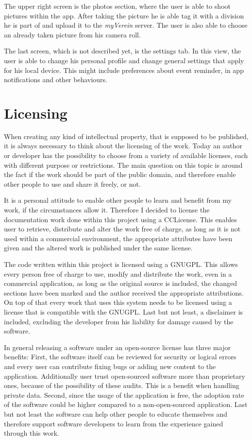 The upper right screen is the photos section, where the user is able to shoot pictures within the app. After taking the picture he is able tag it with a division he is part of and upload it to the \emph{myVerein} server. The user is also able to choose an already taken picture from his camera roll.

The last screen, which is not described yet, is the settings tab. In this view, the user is able to change his personal profile and change general settings that apply for his local device. This might include preferences about event reminder, in app notifications and other behaviours.

\section{Licensing}

When creating any kind of intellectual property, that is supposed to be published, it is always necessary to think about the licensing of the work. Today an author or developer has the possibility to choose from a variety of available licenses, each with different purpose or restrictions. The main question on this topic is around the fact if the work should be part of the public domain, and therefore enable other people to use and share it freely, or not. 

It is a personal attitude to enable other people to learn and benefit from my work, if the circumstances allow it. Therefore I decided to license the documentation work done within this project using a \gls{CCLicense}. This enables user to retrieve, distribute and alter the work free of charge, as long as it is not used within a commercial environment, the appropriate attributes have been given and the altered work is published under the same license. \cite{Commons:2015aa}

The code written within this project is licensed using a \gls{GNUGPL}. This allows every person free of charge to use, modify and distribute the work, even in a commercial application, as long as the original source is included, the changed sections have been marked and the author received the appropriate attributions. On top of that every work that uses this system needs to be licensed using a license that is compatible with the \gls{GNUGPL}. Last but not least, a disclaimer is included, excluding the developer from his liability for damage caused by the software. \cite{Foundation:1991aa}

In general releasing a software under an open-source license has three major benefits: First, the software itself can be reviewed for security or logical errors and every user can contribute fixing bugs or adding new content to the application. Additionally user trust open-sourced software more than proprietary ones, because of the possibility of these audits. This is a benefit when handling private data. Second, since the usage of the application is free, the adoption rate of the software could be higher compared to a non-open-sourced application. Last but not least the software can help other people to educate themselves and therefore support software developers to learn from the experience gained through this work.


